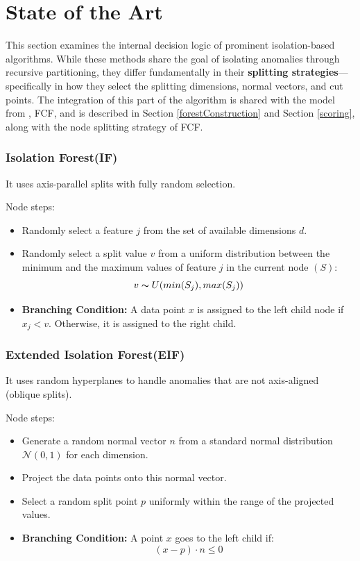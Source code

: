 \section{State of the Art}

This section examines the internal decision logic of prominent isolation-based algorithms. While these methods share the goal of isolating anomalies through recursive partitioning, they differ fundamentally in their \textbf{splitting strategies}—specifically in how they select the splitting dimensions, normal vectors, and cut points. The integration of this part of the algorithm is shared with the model from \cite{cortes2019imputing}, FCF, and is described in Section \ref{forestConstruction} and Section \ref{scoring}, along with the node splitting strategy of FCF.
\subsubsection*{Isolation Forest(IF)}
It uses axis-parallel splits with fully random selection.

Node steps:
\begin{itemize}
    \item Randomly select a feature $j$ from the set of available dimensions $d$.
    \item Randomly select a split value $v$ from a uniform distribution between the minimum and the maximum values of feature $j$ in the current node $(S)$: $$v \thicksim U(min(S_j),max(S_j))$$
    \item \textbf{Branching Condition:} A data point $x$ is assigned to the left child node if $x_j<v$. Otherwise, it is assigned to the right child.
\end{itemize}

\subsubsection*{Extended Isolation Forest(EIF)}
It uses random hyperplanes to handle anomalies that are not axis-aligned (oblique splits).

Node steps:
\begin{itemize}
    \item Generate a random normal vector $n$ from a standard normal distribution $\mathcal{N}(0,1)$ for each dimension.
    \item Project the data points onto this normal vector.
    \item Select a random split point $p$ uniformly within the range of the projected values.
    \item \textbf{Branching Condition:} A point $x$ goes to the left child if: $$(x-p)\cdot n \le 0$$
\end{itemize}

